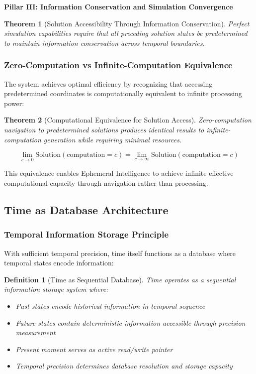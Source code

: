 \documentclass[12pt,a4paper]{article}
\newtheorem{theorem}{Theorem}
\newtheorem{definition}{Definition}
\begin{document}
\textbf{Pillar III: Information Conservation and Simulation Convergence}

\begin{theorem}[Solution Accessibility Through Information Conservation]
Perfect simulation capabilities require that all preceding solution states be predetermined to maintain information conservation across temporal boundaries.
\end{theorem}

\subsubsection{Zero-Computation vs Infinite-Computation Equivalence}

The system achieves optimal efficiency by recognizing that accessing predetermined coordinates is computationally equivalent to infinite processing power:

\begin{theorem}[Computational Equivalence for Solution Access]
Zero-computation navigation to predetermined solutions produces identical results to infinite-computation generation while requiring minimal resources.
\end{theorem}

\begin{equation}
\lim_{c \to 0} \text{Solution}(\text{computation} = c) = \lim_{c \to \infty} \text{Solution}(\text{computation} = c)
\end{equation}

This equivalence enables Ephemeral Intelligence to achieve infinite effective computational capacity through navigation rather than processing.

\subsection{Time as Database Architecture}

\subsubsection{Temporal Information Storage Principle}

With sufficient temporal precision, time itself functions as a database where temporal states encode information:

\begin{definition}[Time as Sequential Database]
Time operates as a sequential information storage system where:
\begin{itemize}
\item Past states encode historical information in temporal sequence
\item Future states contain deterministic information accessible through precision measurement
\item Present moment serves as active read/write pointer
\item Temporal precision determines database resolution and storage capacity
\end{itemize}
\end{definition}
\end{document}
